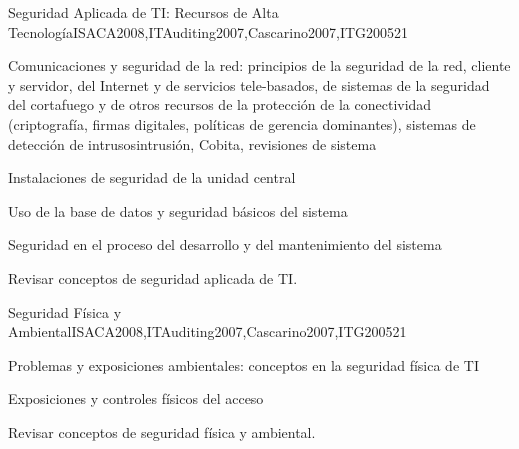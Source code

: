 \begin{syllabus}
    \begin{unit}{Seguridad Aplicada de TI: Recursos de Alta Tecnología}{}{ISACA2008,ITAuditing2007,Cascarino2007,ITG2005}{2}{1}
    \begin{topics}
    \item Comunicaciones y seguridad de la red: principios de la seguridad de la red, cliente y servidor, del Internet y de servicios tele-basados, de sistemas de la seguridad del cortafuego y de otros recursos de la protección de la conectividad (criptografía, firmas digitales, políticas de gerencia dominantes), sistemas de detección de intrusosintrusión, Cobita, revisiones de sistema
    \item Instalaciones de seguridad de la unidad central
    \item Uso de la base de datos y seguridad básicos del sistema
    \item Seguridad en el proceso del desarrollo y del mantenimiento del sistema
    \end{topics}
    \begin{learningoutcomes}
    \item Revisar conceptos de seguridad aplicada de TI.
    \end{learningoutcomes}
    \end{unit}
    
    \begin{unit}{Seguridad Física y Ambiental}{}{ISACA2008,ITAuditing2007,Cascarino2007,ITG2005}{2}{1}
    \begin{topics}
    \item Problemas y exposiciones ambientales: conceptos en la seguridad física de TI
    \item Exposiciones y controles físicos del acceso
    \end{topics}
    \begin{learningoutcomes}
    \item Revisar conceptos de seguridad física y ambiental.
    \end{learningoutcomes}
    \end{unit}
    

\end{syllabus}
